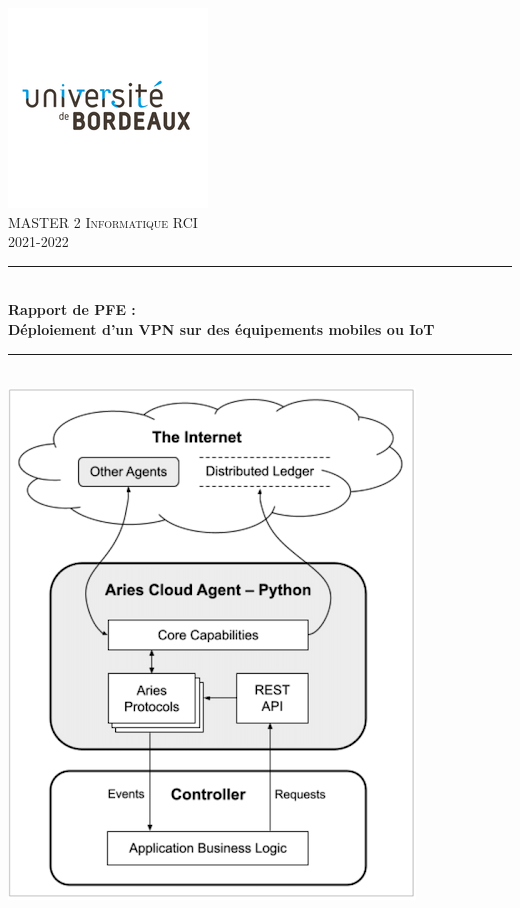 \documentclass[12pt, openany]{report}
\begin{document}
\begin{titlepage}
  \begin{sffamily}
  \begin{center}
	\includegraphics[scale=0.5]{ub.png}~\\[1cm]

    \textsc{\Large MASTER 2 Informatique RCI }\\[1.5cm]
    2021-2022

    \rule{1\linewidth}{2pt}
     \\[1cm]
    { \huge \bfseries Rapport de PFE :\\
    Déploiement d'un VPN sur des équipements mobiles ou IoT\\[1cm] }
    \rule{1\linewidth}{2pt}
    \\[1cm]
    \includegraphics[scale=0.55]{couv.png}
    \\ %


\end{center}
\end{sffamily}
\end{titlepage}
\end{document}
